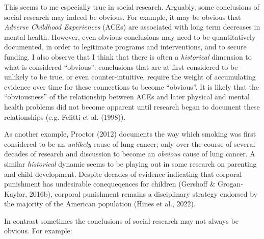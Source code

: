 \documentclass[
  letterpaper,
  DIV=11,
  numbers=noendperiod]{scrreprt}
\begin{document}
This seems to me especially true in social research. Arguably, some
conclusions of social research may indeed be obvious. For example, it
may be obvious that \emph{Adverse Childhood Experiences} (ACEs) are
associated with long term decreases in mental health. However, even
obvious conclusions may need to be quantitatively documented, in order
to legitimate programs and interventions, and to secure funding. I also
observe that I think that there is often a \emph{historical} dimension
to what is considered ``obvious'': conclusions that are at first
considered to be unlikely to be true, or even counter-intuitive, require
the weight of accumulating evidence over time for these connections to
become ``obvious''. It is likely that the ``obviousness'' of the
relationship between ACEs and later physical and mental health problems
did not become apparent until research began to document these
relationships (e.g. Felitti et al. (1998)).

As another example, Proctor (2012) documents the way which smoking was
first considered to be an \emph{unlikely} cause of lung cancer; only
over the course of several decades of research and discussion to become
an \emph{obvious} cause of lung cancer. A similar \emph{historical}
dynamic seems to be playing out in some research on parenting and child
development. Despite decades of evidence indicating that corporal
punishment has undesirable conequeqences for children (Gershoff \&
Grogan-Kaylor, 2016b), corporal punishment remains a disciplinary
strategy endorsed by the majority of the American population (Hines et
al., 2022).

In contrast sometimes the conclusions of social research may not always
be obvious. For example:
\end{document}
